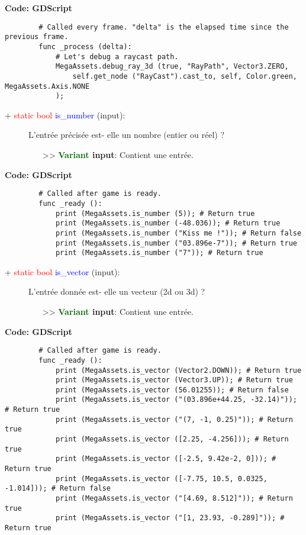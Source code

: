 \documentclass[a4paper, 11pt]{article}
\begin{document}
	\textbf{Code: GDScript}
	\begin{lstlisting}
		# Called every frame. "delta" is the elapsed time since the previous frame.
		func _process (delta):
			# Let's debug a raycast path.
			MegaAssets.debug_ray_3d (true, "RayPath", Vector3.ZERO,
				self.get_node ("RayCast").cast_to, self, Color.green, MegaAssets.Axis.NONE
			);
	\end{lstlisting}
	\begin{description}
		\item [+ \textcolor{red}{static bool} \textcolor{blue}{is\_number} (input):] L'entrée précisée est-
		elle un nombre (entier ou réel) ?
		\begin{itemize}
			\item [>> \textbf{\textcolor{darkgreen}{Variant} input}:] Contient une entrée.\\
		\end{itemize}
	\end{description}
	\textbf{Code: GDScript}
	\begin{lstlisting}
		# Called after game is ready.
		func _ready ():
			print (MegaAssets.is_number (5)); # Return true
			print (MegaAssets.is_number (-48.036)); # Return true
			print (MegaAssets.is_number ("Kiss me !")); # Return false
			print (MegaAssets.is_number ("03.896e-7")); # Return true
			print (MegaAssets.is_number ("7")); # Return true
	\end{lstlisting}
	\begin{description}
		\item [+ \textcolor{red}{static bool} \textcolor{blue}{is\_vector} (input):] L'entrée donnée est-
		elle un vecteur (2d ou 3d) ?
		\begin{itemize}
			\item [>> \textbf{\textcolor{darkgreen}{Variant} input}:] Contient une entrée.\\
		\end{itemize}
	\end{description}
	\textbf{Code: GDScript}
	\begin{lstlisting}
		# Called after game is ready.
		func _ready ():
			print (MegaAssets.is_vector (Vector2.DOWN)); # Return true
			print (MegaAssets.is_vector (Vector3.UP)); # Return true
			print (MegaAssets.is_vector (56.01255)); # Return false
			print (MegaAssets.is_vector ("(03.896e+44.25, -32.14)")); # Return true
			print (MegaAssets.is_vector ("(7, -1, 0.25)")); # Return true
			print (MegaAssets.is_vector ([2.25, -4.256])); # Return true
			print (MegaAssets.is_vector ([-2.5, 9.42e-2, 0])); # Return true
			print (MegaAssets.is_vector ([-7.75, 10.5, 0.0325, -1.014])); # Return false
			print (MegaAssets.is_vector ("[4.69, 8.512]")); # Return true
			print (MegaAssets.is_vector ("[1, 23.93, -0.289]")); # Return true
	\end{lstlisting}
\end{document}
